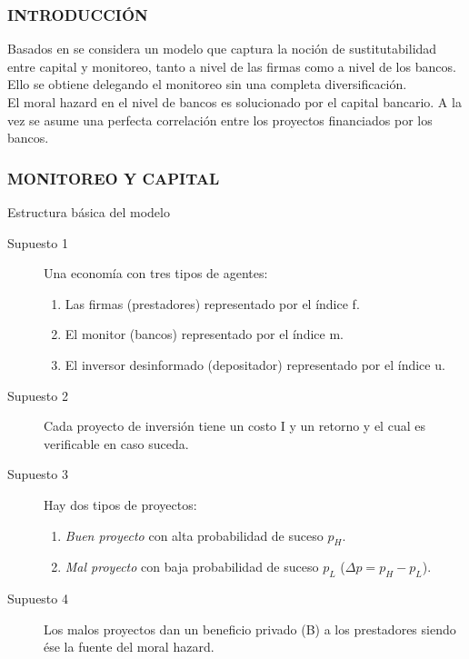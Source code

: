 \begin{frame}
	\frametitle{{\normalsize INTRODUCCIÓN} {}}
		\setcounter{equation}{0}
Basados en  \cite{Tirole1997} se considera un modelo que captura la noción de sustitutabilidad entre capital y monitoreo, tanto a nivel de las firmas como a nivel de los bancos. Ello se obtiene delegando el monitoreo sin una completa diversificación. \\
El moral hazard en el nivel de bancos es solucionado por el capital bancario. A la vez se asume una perfecta correlación entre los proyectos financiados por los bancos.\\



 

\end{frame}

\begin{frame}
    \frametitle{{\normalsize MONITOREO Y CAPITAL} {}}
    
    \begin{block} {Estructura básica del modelo}
        \begin{description}
            \item[Supuesto 1]  Una economía con tres tipos de agentes:
            \begin{enumerate}
                \item Las firmas (prestadores) representado por el índice f.
                \item El monitor (bancos) representado por el índice m.
                \item El inversor desinformado (depositador) representado por el índice u.
            \end{enumerate}  
            \item[Supuesto 2] Cada proyecto de inversión tiene un costo I y un retorno y el cual es verificable en caso suceda. 
            \item[Supuesto 3] Hay dos tipos de proyectos:
            \begin{enumerate}
               \item \textit{Buen proyecto} con alta probabilidad de suceso $p_{H}$.
               \item \textit{Mal proyecto} con baja probabilidad de suceso $p_{L}$ ($\Delta p= p_{H}-p_{L}$). 
            \end{enumerate}
            \item[Supuesto 4] Los malos proyectos dan un beneficio privado (B) a los prestadores siendo ése la fuente del moral hazard.
            
           
             
            \end{description}
        
    \end{block}	
    
\end{frame}


